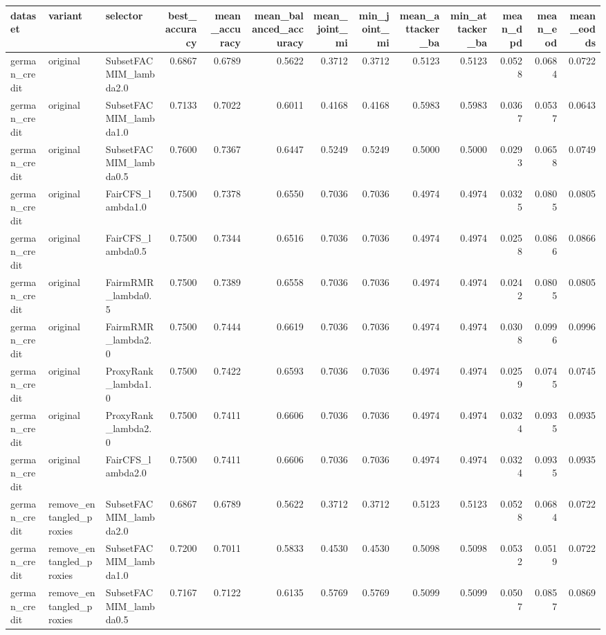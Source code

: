 \begin{tabular}{lllrrrrrrrrrr}
\toprule
dataset & variant & selector & best_accuracy & mean_accuracy & mean_balanced_accuracy & mean_joint_mi & min_joint_mi & mean_attacker_ba & min_attacker_ba & mean_dpd & mean_eod & mean_eodds \\
\midrule
german_credit & original & SubsetFACMIM_lambda2.0 & 0.6867 & 0.6789 & 0.5622 & 0.3712 & 0.3712 & 0.5123 & 0.5123 & 0.0528 & 0.0684 & 0.0722 \\
german_credit & original & SubsetFACMIM_lambda1.0 & 0.7133 & 0.7022 & 0.6011 & 0.4168 & 0.4168 & 0.5983 & 0.5983 & 0.0367 & 0.0537 & 0.0643 \\
german_credit & original & SubsetFACMIM_lambda0.5 & 0.7600 & 0.7367 & 0.6447 & 0.5249 & 0.5249 & 0.5000 & 0.5000 & 0.0293 & 0.0658 & 0.0749 \\
german_credit & original & FairCFS_lambda1.0 & 0.7500 & 0.7378 & 0.6550 & 0.7036 & 0.7036 & 0.4974 & 0.4974 & 0.0325 & 0.0805 & 0.0805 \\
german_credit & original & FairCFS_lambda0.5 & 0.7500 & 0.7344 & 0.6516 & 0.7036 & 0.7036 & 0.4974 & 0.4974 & 0.0258 & 0.0866 & 0.0866 \\
german_credit & original & FairmRMR_lambda0.5 & 0.7500 & 0.7389 & 0.6558 & 0.7036 & 0.7036 & 0.4974 & 0.4974 & 0.0242 & 0.0805 & 0.0805 \\
german_credit & original & FairmRMR_lambda2.0 & 0.7500 & 0.7444 & 0.6619 & 0.7036 & 0.7036 & 0.4974 & 0.4974 & 0.0308 & 0.0996 & 0.0996 \\
german_credit & original & ProxyRank_lambda1.0 & 0.7500 & 0.7422 & 0.6593 & 0.7036 & 0.7036 & 0.4974 & 0.4974 & 0.0259 & 0.0745 & 0.0745 \\
german_credit & original & ProxyRank_lambda2.0 & 0.7500 & 0.7411 & 0.6606 & 0.7036 & 0.7036 & 0.4974 & 0.4974 & 0.0324 & 0.0935 & 0.0935 \\
german_credit & original & FairCFS_lambda2.0 & 0.7500 & 0.7411 & 0.6606 & 0.7036 & 0.7036 & 0.4974 & 0.4974 & 0.0324 & 0.0935 & 0.0935 \\
german_credit & remove_entangled_proxies & SubsetFACMIM_lambda2.0 & 0.6867 & 0.6789 & 0.5622 & 0.3712 & 0.3712 & 0.5123 & 0.5123 & 0.0528 & 0.0684 & 0.0722 \\
german_credit & remove_entangled_proxies & SubsetFACMIM_lambda1.0 & 0.7200 & 0.7011 & 0.5833 & 0.4530 & 0.4530 & 0.5098 & 0.5098 & 0.0532 & 0.0519 & 0.0722 \\
german_credit & remove_entangled_proxies & SubsetFACMIM_lambda0.5 & 0.7167 & 0.7122 & 0.6135 & 0.5769 & 0.5769 & 0.5099 & 0.5099 & 0.0507 & 0.0857 & 0.0869 \\

\end{tabular}

